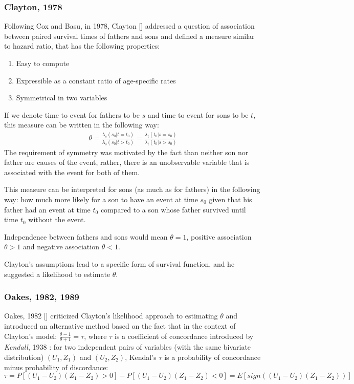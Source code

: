 \documentclass[]{article}
\begin{document}
\subsubsection{Clayton, 1978}
Following Cox and Basu, in 1978, Clayton [\cite{clayton1978model}] addressed a question of association between paired survival times of fathers and sons and defined a measure similar to hazard ratio, that has the following properties:
\begin{enumerate}
	\item Easy to compute
	\item Expressible as a constant ratio of age-specific rates
  \item Symmetrical in two variables
\end{enumerate}
If we denote time to event for fathers to be $s$ and time to event for sons to be $t$, this measure can be written in the following way:
$$
\begin{aligned}
	\theta = \frac{\lambda_s(s_0|t=t_0)}{\lambda_s(s_0|t>t_0)} = \frac{\lambda_t(t_0|s=s_0)}{\lambda_t(t_0|s>s_0)}
\end{aligned}
$$
The requirement of symmetry was motivated by the fact than neither son nor father are causes of the event, rather, there is an unobservable variable that is associated with the event for both of them.

This measure can be interpreted for sons (as much as for fathers) in the following way: how much more likely for a son to have an event at time $s_0$ given that his father had an event at time $t_0$ compared to a son whose father survived until time $t_0$ without the event.

Independence between fathers and sons would mean $\theta = 1$, positive association $\theta > 1$ and negative association $\theta < 1$. %

Clayton's assumptions lead to a specific form of survival function, and he suggested a likelihood to estimate $\theta$.


\subsubsection{Oakes, 1982, 1989}
Oakes, 1982 [\cite{oakes1982model}] criticized Clayton's likelihood approach to estimating $\theta$ and introduced an alternative method based on the fact that in the context of Clayton's model: $\frac{\theta - 1}{\theta + 1} = \tau$, where $\tau$ is a coefficient of concordance introduced by \emph{Kendall}, 1938 \cite{kendall1938new}: for two independent pairs of variables (with the same bivariate distribution) $(U_1, Z_1)$ and $(U_2, Z_2)$, Kendal's $\tau$ is a probability of concordance minus probability of discordance:
$\tau = P[(U_1 - U_2)(Z_1 - Z_2)>0] - P[(U_1 - U_2)(Z_1 - Z_2)<0] = E[sign((U_1 - U_2)(Z_1 - Z_2))]$\\
\end{document}
